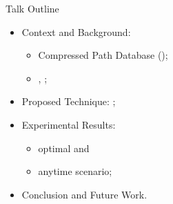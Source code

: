    

\begin{frame}{Talk Outline}
    \begin{itemize}
        \item Context and Background:
        \begin{itemize}
            \item Compressed Path Database (\CPD{});
            \item \ALT{}, \AWA{};
        \end{itemize}
        \item Proposed Technique: \CPDSearch{};
        \item Experimental Results: 
            \begin{itemize}
                \item optimal and 
                \item anytime scenario;
            \end{itemize}
        \item Conclusion and Future Work.
    \end{itemize}
\end{frame}